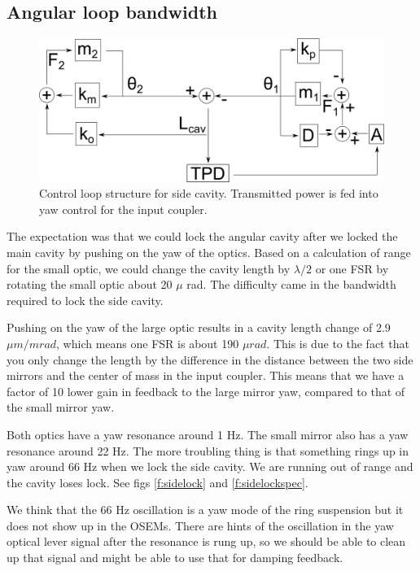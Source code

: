 \subsection{Angular loop bandwidth}

\begin{figure}[htp]
\vspace{5pt}
\begin{center}
\includegraphics[width=.8\textwidth]{figures/Angular/ANGblocks2}
\end{center}
\caption[Folded cavity block diagram]{%
\label{f:angblocks}
Control loop structure for side cavity. Transmitted power is fed into yaw control for the input coupler.}
\end{figure}

The expectation was that we could lock the angular cavity after we locked the main cavity by pushing on the yaw of the optics.
Based on a calculation of range for the small optic, we could change the cavity length by $\lambda/2$ or one FSR by rotating the small optic about 20 $\mu$ rad. 
The difficulty came in the bandwidth required to lock the side cavity.

Pushing on the yaw of the large optic results in a cavity length change of 2.9 $\mu m/m rad$, which means one FSR is about 190 $\mu rad$. 
This is due to the fact that you only change the length by the difference in the distance between the two side mirrors and the center of mass in the input coupler. 
This means that we have a factor of 10 lower gain in feedback to the large mirror yaw, compared to that of the small mirror yaw.

Both optics have a yaw resonance around 1 Hz. The small mirror also has a yaw resonance around 22 Hz.
The more troubling thing is that something rings up in yaw around 66 Hz when we lock the side cavity. We are running out of range and the cavity loses lock. See figs \ref{f:sidelock} and \ref{f:sidelockspec}.

We think that the 66 Hz oscillation is a yaw mode of the ring suspension but it does not show up in the OSEMs. There are hints of the oscillation in the yaw optical lever signal after the resonance is rung up, so we should be able to clean up that signal and might be able to use that for damping feedback. 

